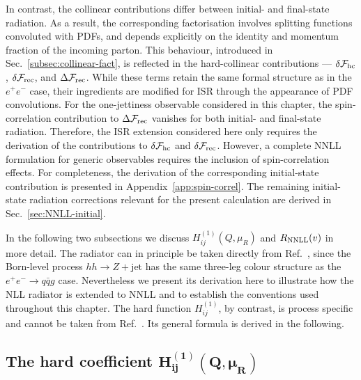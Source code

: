 \begin{itemize}
In contrast, the collinear contributions differ between initial- and
final-state radiation.  As a result, the corresponding factorisation involves
splitting functions convoluted with PDFs, and depends explicitly on the
identity and momentum fraction of the incoming parton. This behaviour,
introduced in Sec.~\ref{subsec:collinear-fact}, is reflected in the
hard-collinear contributions --- $\delta\mathcal{F}_{\rm hc}$, $\delta\mathcal{F}_{\rm rec}$, and
$\Delta\mathcal{F}_{\rm rec}$. While these terms retain the same formal
structure as in the $e^+e^-$ case, their ingredients are modified for
ISR through the appearance of PDF convolutions. For the one-jettiness
observable considered in this chapter, the spin-correlation contribution
to $\Delta\mathcal{F}_{\rm rec}$ vanishes for both initial- and
final-state radiation. Therefore, the ISR extension considered here
only requires the derivation of the contributions to
$\delta\mathcal{F}_{\rm hc}$ and $\delta\mathcal{F}_{\rm rec}$.
However, a complete NNLL formulation for generic observables requires
the inclusion of spin-correlation effects. For completeness, the
derivation of the corresponding initial-state contribution is presented in
Appendix~\ref{app:spin-correl}. The remaining initial-state radiation
corrections relevant for the present calculation are derived in
Sec.~\ref{sec:NNLL-initial}.
  
  \end{itemize} 
  
  In the following two subsections we discuss $H_{ij}^{(1)}(Q,\mu_R)$
and $R_{\rm NNLL}(v)$ in more detail. The radiator can in principle
be taken directly from Ref.~\cite{Arpino:2019ozn}, since the Born-level process
$hh\to Z+\text{jet}$ has the same three-leg colour structure as the
$e^+e^-\to q\bar q g$ case. Nevertheless we present its derivation here to
illustrate how the NLL radiator is extended to NNLL and to
establish the conventions used throughout this chapter. The hard
function $H_{ij}^{(1)}$, by contrast, is process specific
and cannot be taken from Ref.~\cite{Arpino:2019ozn}. Its general
formula is derived in the following.


\subsection{The hard coefficient $\mathbf{H_{ij}^{(1)}(Q,\mu_R)}$}
\label{sec:H1}

